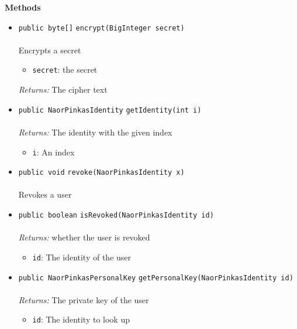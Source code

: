 \textbf{\sffamily Methods}
\begin{itemize}
\item \lstinline|public byte[]| \lstinline|encrypt|\lstinline|(BigInteger secret)|\\ \\[-0.6em]
Encrypts a secret
\begin{itemize}
\item \lstinline|secret|: the secret
\end{itemize}

\emph{Returns:} The cipher text

\item \lstinline|public NaorPinkasIdentity| \lstinline|getIdentity|\lstinline|(int i)|\\ \\[-0.6em]
\emph{Returns:} The identity with the given index
\begin{itemize}
\item \lstinline|i|: An index
\end{itemize}



\item \lstinline|public void| \lstinline|revoke|\lstinline|(NaorPinkasIdentity x)|\\ \\[-0.6em]
Revokes a user



\item \lstinline|public boolean| \lstinline|isRevoked|\lstinline|(NaorPinkasIdentity id)|\\ \\[-0.6em]
\emph{Returns:} whether the user is revoked
\begin{itemize}
\item \lstinline|id|: The identity of the user
\end{itemize}



\item \lstinline|public NaorPinkasPersonalKey| \lstinline|getPersonalKey|\lstinline|(NaorPinkasIdentity id)|\\ \\[-0.6em]
\emph{Returns:} The private key of the user
\begin{itemize}
\item \lstinline|id|: The identity to look up
\end{itemize}



\end{itemize}

